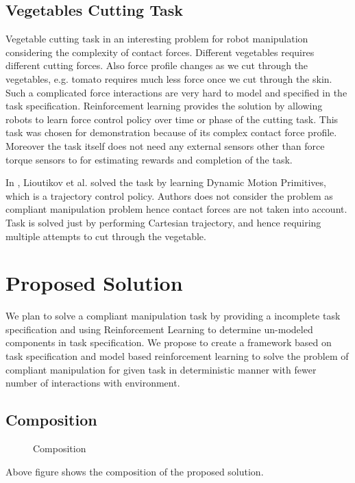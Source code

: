 \documentclass[thesis]{mas_proposal}
\begin{document}
\section{Vegetables Cutting Task}
Vegetable cutting task in an interesting problem for robot manipulation considering the complexity of contact forces. Different vegetables requires different cutting forces. Also force profile changes as we cut through the vegetables, e.g. tomato requires much less force once we cut through the skin. Such a complicated force interactions are very hard to model and specified in the task specification. Reinforcement learning provides the solution by allowing robots to learn force control policy over time or phase of the cutting task. This task was chosen for demonstration because of its complex contact force profile. Moreover the task itself does not need any external sensors other than force torque sensors to for estimating rewards and completion of the task.

In \cite{lioutikov2016learning}, Lioutikov et al. solved the task by learning Dynamic Motion Primitives, which is a trajectory control policy. Authors does not consider the problem as compliant manipulation problem hence contact forces are not taken into account. Task is solved just by performing Cartesian trajectory, and hence requiring multiple attempts to cut through the vegetable. 


\chapter{Proposed Solution}

We plan to solve a compliant manipulation task by providing a incomplete task specification and using Reinforcement Learning to determine un-modeled components in task specification. We propose to create a framework based on task specification and model based reinforcement learning to solve the problem of compliant manipulation for given task in deterministic manner with fewer number of interactions with environment.

\section{Composition}

\begin{figure}[!h]
	\caption{\label{fig:composition} Composition}
\end{figure}
Above figure shows the composition of the proposed solution.
\end{document}
